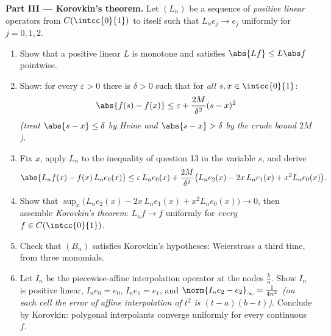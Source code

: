 \begin{problem}
\medskip
\noindent\textbf{Part III --- Korovkin's theorem.} Let $(L_n)$
be a sequence of \emph{positive linear} operators from
$C(\intcc{0}{1})$ to itself such that $L_ne_j \to e_j$
uniformly for $j = 0, 1, 2$.
\begin{enumerate}[resume]
  \item Show that a positive linear $L$ is monotone and
        satisfies $\abs{Lf} \leq L\abs f$ pointwise.
  \item Show: for every $\varepsilon > 0$ there is $\delta > 0$
        such that for \emph{all} $s, x \in \intcc{0}{1}$:
        \[
        \abs{f(s) - f(x)} \leq \varepsilon +
        \frac{2M}{\delta^2}(s - x)^2
        \]
        \emph{(treat $\abs{s - x} \leq \delta$ by Heine and
        $\abs{s-x} > \delta$ by the crude bound $2M$)}.
  \item Fix $x$, apply $L_n$ to the inequality of question 13
        in the variable $s$, and derive
        \[
        \abs{L_nf(x) - f(x)\,L_ne_0(x)}
        \leq \varepsilon\,L_ne_0(x) + \frac{2M}{\delta^2}
        \bigl(L_ne_2(x) - 2x\,L_ne_1(x) + x^2 L_ne_0(x)\bigr).
        \]
  \item Show that $\sup_x \bigl(L_ne_2(x) - 2x\,L_ne_1(x) + x^2
        L_ne_0(x)\bigr) \to 0$, then assemble
        \emph{Korovkin's theorem}: $L_nf \to f$ uniformly for
        \emph{every} $f \in C(\intcc{0}{1})$.
  \item Check that $(B_n)$ satisfies Korovkin's hypotheses:
        Weierstrass a third time, from three monomials.
  \item Let $I_n$ be the piecewise-affine interpolation
        operator at the nodes $\frac kn$. Show $I_n$ is
        positive linear, $I_ne_0 = e_0$, $I_ne_1 = e_1$, and
        $\norm{I_ne_2 - e_2}_\infty = \frac{1}{4n^2}$
        \emph{(on each cell the error of affine interpolation
        of $t^2$ is $(t - a)(b - t)$)}. Conclude by Korovkin:
        polygonal interpolants converge uniformly for every
        continuous $f$.
\end{enumerate}


\end{problem}
